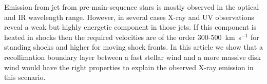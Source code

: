 Emission from jet from pre-main-sequence stars is mostly observed in the optical and IR wavelength range. However, in several cases X-ray and UV observations reveal a weak but highly energetic component in those jets. If this component is heated in shocks then the required velocities are of the order 300-500~km~s$^{-1}$ for standing shocks and higher for moving shock fronts. In this article we show that a recollimation boundary layer between a fast stellar wind and a more massive disk wind would have the right properties to explain the observed X-ray emission in this scenario.
